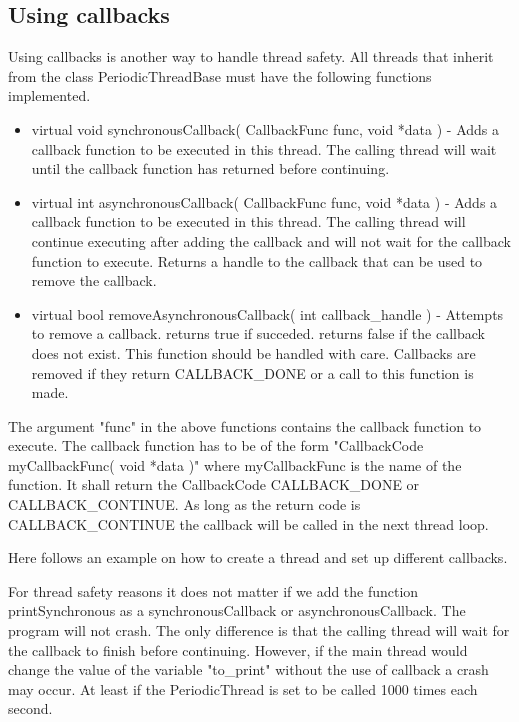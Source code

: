 

\subsection{Using callbacks}
Using callbacks is another way to handle thread safety. All threads that
inherit from the class PeriodicThreadBase must have the following functions
implemented.

\begin{itemize}
\item virtual void synchronousCallback( CallbackFunc func, void *data ) - Adds
  a callback function to be executed in this thread. The calling thread will
  wait until the callback function has returned before continuing.
\item virtual int asynchronousCallback( CallbackFunc func, void *data ) - Adds
  a callback function to be executed in this thread. The calling thread will
  continue executing after adding the callback and will not wait for the
  callback function to execute. Returns a handle to the callback that can be
  used to remove the callback.
\item virtual bool removeAsynchronousCallback( int callback\_handle ) - 
  Attempts to remove a callback. returns true if succeded. returns false if
  the callback does not exist. This function should be handled with care.
  Callbacks are removed if they return CALLBACK\_DONE or a call to this
  function is made.
\end{itemize}

The argument "func" in the above functions contains the callback function to
execute. The callback function has to be of the form
"CallbackCode myCallbackFunc( void *data )" where myCallbackFunc is the name of
the function. It shall return the CallbackCode CALLBACK\_DONE or
CALLBACK\_CONTINUE. As long as the return code is CALLBACK\_CONTINUE the
callback will be called in the next thread loop.

Here follows an example on how to create a thread and set up different
callbacks.



For thread safety reasons it does not matter if we add the function
printSynchronous as a synchronousCallback or asynchronousCallback. The program
will not crash. The only difference is that the calling thread will wait for
the callback to finish before continuing. However, if the main thread would
change the value of the variable "to\_print" without the use of callback a
crash may occur. At least if the PeriodicThread is set to be called 1000 times
each second.

